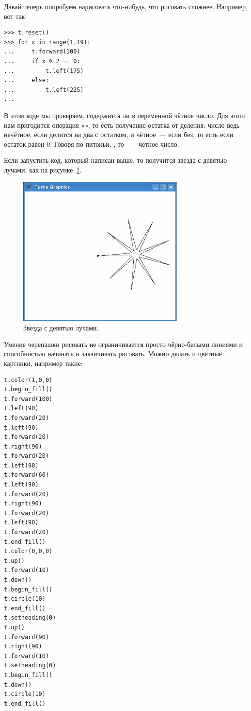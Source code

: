 Давай теперь попробуем нарисовать что-нибудь, что рисовать сложнее. Например, вот так:

\begin{listing}
\begin{verbatim}
>>> t.reset()
>>> for x in range(1,19):
...     t.forward(100)
...     if x % 2 == 0:
...         t.left(175)
...     else:
...         t.left(225)
...
\end{verbatim}
\end{listing}

В этом коде мы проверяем, содержится ли в переменной  чётное число. Для этого нам пригодится операция «\code{\%}», то есть получение остатка от деления: число ведь нечётное, если делится на два с остатком, и чётное — если без, то есть если остаток равен 0. Говоря по-питоньи, , то  — чётное число.

Если запустить код, который написан выше, то получится звезда с девятью лучами, как на рисунке \ref{fig23}.

\begin{figure}
\begin{center}
\includegraphics[width=84mm]{../en/figure23.eps}
\end{center}
\caption{Звезда с девятью лучами.}\label{fig23}
\end{figure}

Умение черепашки рисовать не ограничивается просто чёрно-белыми линиями и способностью начинать и заканчивать рисовать. Можно делать и цветные картинки, например такие:

\begin{listing}
\begin{verbatim}
t.color(1,0,0)
t.begin_fill()
t.forward(100)
t.left(90)
t.forward(20)
t.left(90)
t.forward(20)
t.right(90)
t.forward(20)
t.left(90)
t.forward(60)
t.left(90)
t.forward(20)
t.right(90)
t.forward(20)
t.left(90)
t.forward(20)
t.end_fill()
t.color(0,0,0)
t.up()
t.forward(10)
t.down()
t.begin_fill()
t.circle(10)
t.end_fill()
t.setheading(0)
t.up()
t.forward(90)
t.right(90)
t.forward(10)
t.setheading(0)
t.begin_fill()
t.down()
t.circle(10)
t.end_fill()
\end{verbatim}
\end{listing}


